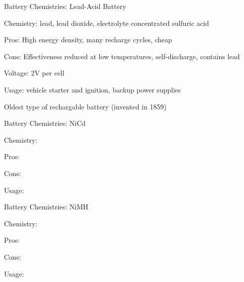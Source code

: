 \documentclass[12pt,t]{beamer}
\begin{document}
\begin{frame}[c]{Battery Chemistries: Lead-Acid Battery }
\bbi   
\item Chemistry: lead, lead dioxide, electrolyte concentrated sulfuric acid
\item Pros: High energy density, many recharge cycles, cheap
\item Cons: Effectiveness reduced at low temperatures, self-discharge, contains lead 
\item Voltage: 2V per cell
\item Usage: vehicle starter and ignition, backup power supplies
\item Oldest type of rechargable battery (invented in 1859)
\ei     
\end{frame}

\begin{frame}[c]{Battery Chemistries: NiCd }
\bbi    
\item Chemistry:
\item Pros:     
\item Cons:
\item Usage:
\ei     
\end{frame}

\begin{frame}[c]{Battery Chemistries: NiMH }
\bbi    
\item Chemistry:
\item Pros:     
\item Cons:
\item Usage:
\ei     
\end{frame}
\end{document}
